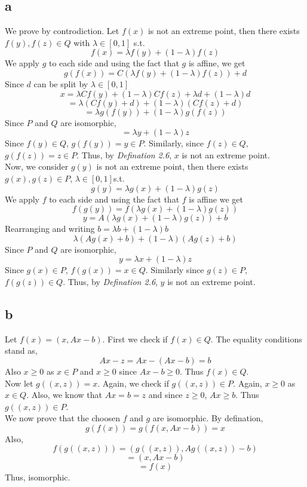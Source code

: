 \documentclass[11pt]{article}
\begin{document}
\subsection*{a}
We prove by controdiction. Let $f(x)$ is not an extreme point, then there exists $f(y), f(z) \in Q$ with $\lambda \in [0,1]$ s.t.\\
\[f(x) = \lambda f(y) + (1-\lambda)f(z)\]
We apply $g$ to each side and using the fact that $g$ is affine, we get \\
\[g(f(x)) = C(\lambda f(y) + (1-\lambda)f(z)) + d\]
Since $d$ can be split by $\lambda \in [0,1]$
\[x = \lambda C f(y) + (1 - \lambda) C f(z) + \lambda d + (1 - \lambda) d\]
\[ = \lambda(Cf(y) + d) + (1-\lambda)(Cf(z) + d)\]
\[= \lambda g(f(y)) + (1 - \lambda)g(f(z))\]
Since $P$ and $Q$ are isomorphic,  
\[ = \lambda y + (1 - \lambda)z\]
Since $f(y) \in Q$, $g(f(y)) = y \in P$. Similarly, since $f(z) \in Q$, $g(f(z)) = z \in P$. Thus, by \textit{Defination 2.6}, $x$ is not an extreme point. \\
Now, we consider $g(y)$ is not an extreme point, then there exists $g(x), g(z) \in P$, $\lambda \in [0,1]$s.t. 
\[g(y) = \lambda g(x) + (1 - \lambda)g(z)\]
We apply $f$ to each side and using the fact that $f$ is affine we get
\[f(g(y)) = f(\lambda g(x) + (1 - \lambda)g(z))\]
\[y = A(\lambda g(x) + (1 - \lambda)g(z)) + b\]
Rearranging and writing $b = \lambda b + (1 - \lambda)b$
\[\lambda(Ag(x) + b) + (1 - \lambda)(Ag(z) + b)\]
Since $P$ and $Q$ are isomorphic,
\[y = \lambda x + (1-\lambda)z\]
Since $g(x) \in P$, $f(g(x)) = x \in Q$. Similarly since $g(z) \in P$, $f(g(z)) \in Q$. Thus, by \textit{Defination 2.6}, $y$ is not an extreme point. 


\subsection*{b}
Let $f(x) = (x, Ax - b)$. First we check if $f(x) \in Q$. The equality conditions stand as,
\[Ax - z = Ax - (Ax - b) = b\]
Also $x \ge 0$ as $x \in P$ and $x \ge 0$ since $Ax -b \ge 0$. Thus $f(x) \in Q$. \\
Now let $g((x,z)) = x$. Again, we check if $g((x,z)) \in P$. Again, $x \ge 0$ as $x \in Q$. Also, we know that $Ax = b = z$ and since $z \ge 0$, $Ax \ge b$.
Thus $g((x,z)) \in P$. \\
We now prove that the choosen $f$ and $g$ are isomorphic. By defination,
\[g(f(x)) = g(f(x, Ax -b)) = x\] 
Also, 
\[f(g((x,z))) = (g((x,z)) , Ag((x,z)) - b) \]
\[= (x, Ax -b) \] 
\[= f(x)\]
Thus, isomorphic.
\end{document}
